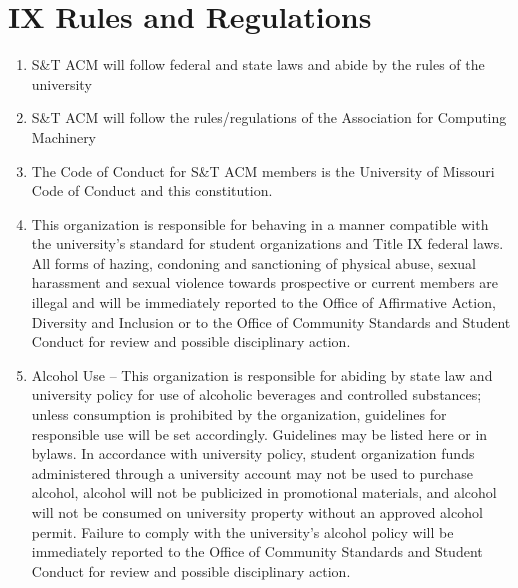 
\section{IX \textendash{} Rules and Regulations} \label{sec:rules_and_regulations}
  \begin{enumerate}
    \item S\&T ACM will follow federal and state laws and abide by the rules
    of the university
    \item S\&T ACM will follow the rules/regulations of the Association for Computing
    Machinery
    \item The Code of Conduct for S\&T ACM members is the University of
    Missouri Code of Conduct and this constitution.
    \item This organization is responsible for behaving in a manner compatible with
    the university’s standard for student organizations and Title IX federal laws.
    All forms of hazing, condoning and sanctioning of physical abuse, sexual
    harassment and sexual violence towards prospective or current members are
    illegal and will be immediately reported to the Office of Affirmative Action,
    Diversity and Inclusion or to the Office of Community Standards and Student
    Conduct for review and possible disciplinary action.
    \item Alcohol Use – This organization is responsible for abiding by state law
    and university policy for use of alcoholic beverages and controlled substances;
    unless consumption is prohibited by the organization, guidelines for responsible
    use will be set accordingly. {Guidelines may be listed here or in bylaws}. In
    accordance with university policy, student organization funds administered
    through a university account may not be used to purchase alcohol, alcohol will
    not be publicized in promotional materials, and alcohol will not be consumed on
    university property without an approved alcohol permit. Failure to comply with
    the university’s alcohol policy will be immediately reported to the Office of
    Community Standards and Student Conduct for review and possible disciplinary
    action.
  \end{enumerate}
